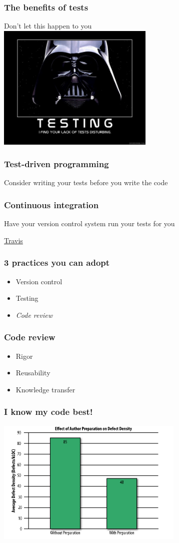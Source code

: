 \documentclass{beamer}
\begin{document}
\begin{frame}
\frametitle{The benefits of tests}
Don't let this happen to you
\\
\includegraphics[height=6cm]{figures/lack_of_tests.jpg}
\end{frame}

\begin{frame}
\frametitle{Test-driven programming}
Consider writing your tests before you write the code
\end{frame}


\begin{frame}
\frametitle{Continuous integration}
Have your version control system run your tests for you

\href{https://travis-ci.org}{Travis}

\end{frame}

\begin{frame}
\frametitle{3 practices you can adopt}
\begin{itemize}
\item
Version control
\item
Testing
\item
\emph{Code review}
\end{itemize}
\end{frame}


\begin{frame}
\frametitle{Code review}
\begin{itemize}
\pause
\item
Rigor
\pause
\item
Reusability
\pause
\item
Knowledge transfer
\end{itemize}
\end{frame}

\begin{frame}
\frametitle{I know my code best!}
\includegraphics[height=6cm]{figures/two_heads_better_than_one.png}

\end{frame}
\end{document}
